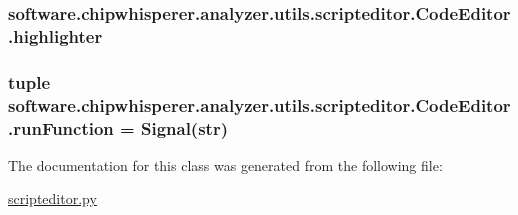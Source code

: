 \subsubsection[{highlighter}]{\setlength{\rightskip}{0pt plus 5cm}software.\+chipwhisperer.\+analyzer.\+utils.\+scripteditor.\+Code\+Editor.\+highlighter}\label{classsoftware_1_1chipwhisperer_1_1analyzer_1_1utils_1_1scripteditor_1_1CodeEditor_a131d73170dc9a8e02972083066771167}
\hypertarget{classsoftware_1_1chipwhisperer_1_1analyzer_1_1utils_1_1scripteditor_1_1CodeEditor_acf04b5a4626c3118d07213612582d8ec}{}
\subsubsection[{run\+Function}]{\setlength{\rightskip}{0pt plus 5cm}tuple software.\+chipwhisperer.\+analyzer.\+utils.\+scripteditor.\+Code\+Editor.\+run\+Function = Signal(str)\hspace{0.3cm}{\ttfamily [static]}}\label{classsoftware_1_1chipwhisperer_1_1analyzer_1_1utils_1_1scripteditor_1_1CodeEditor_acf04b5a4626c3118d07213612582d8ec}


The documentation for this class was generated from the following file\+:\begin{DoxyCompactItemize}
\item 
\hyperlink{scripteditor_8py}{scripteditor.\+py}\end{DoxyCompactItemize}
